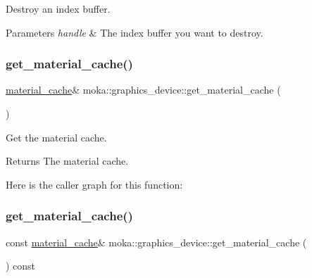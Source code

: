 Destroy an index buffer. 


\begin{DoxyParams}{Parameters}
{\em handle} & The index buffer you want to destroy. \\
\hline
\end{DoxyParams}
\mbox{\label{classmoka_1_1graphics__device_a89fa05e0146e2f4ec171c48321c27fe2}} 
\subsubsection{\texorpdfstring{get\_material\_cache()}{get\_material\_cache()}\hspace{0.1cm}{\footnotesize\ttfamily [1/2]}}
{\footnotesize\ttfamily \mbox{\hyperlink{classmoka_1_1material__cache}{material\+\_\+cache}}\& moka\+::graphics\+\_\+device\+::get\+\_\+material\+\_\+cache (\begin{DoxyParamCaption}{ }\end{DoxyParamCaption})}



Get the material cache. 

\begin{DoxyReturn}{Returns}
The material cache. 
\end{DoxyReturn}
Here is the caller graph for this function\+:
\mbox{\label{classmoka_1_1graphics__device_ab40f1a8e7fcb32ffb04d79dc0d9167c8}} 
\subsubsection{\texorpdfstring{get\_material\_cache()}{get\_material\_cache()}\hspace{0.1cm}{\footnotesize\ttfamily [2/2]}}
{\footnotesize\ttfamily const \mbox{\hyperlink{classmoka_1_1material__cache}{material\+\_\+cache}}\& moka\+::graphics\+\_\+device\+::get\+\_\+material\+\_\+cache (\begin{DoxyParamCaption}{ }\end{DoxyParamCaption}) const}



